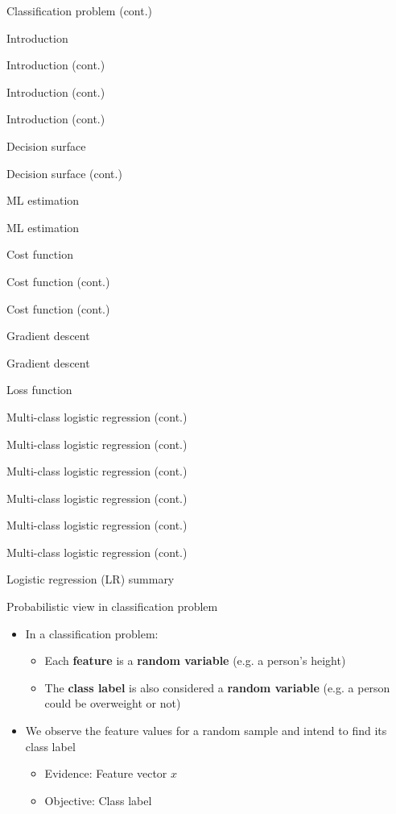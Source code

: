\documentclass[serif, aspectratio=169]{beamer}
\begin{document}
\begin{frame}{Classification problem (cont.)}
\begin{itemize}
\begin{frame}{Introduction}
\begin{itemize}
\begin{frame}{Introduction (cont.)}
\begin{frame}{Introduction (cont.)}
\begin{frame}{Introduction (cont.)}
\begin{frame}{Decision surface}
\begin{itemize}
\begin{frame}{Decision surface (cont.)}
\begin{frame}{ML estimation}
\begin{frame}{ML estimation}
\begin{itemize}
\begin{frame}{Cost function}
\begin{frame}{Cost function (cont.)}
\begin{itemize}
\begin{itemize}
\begin{frame}{Cost function (cont.)}
\begin{frame}{Gradient descent}
\begin{frame}{Gradient descent}
\begin{frame}{Loss function}
\begin{frame}{Multi-class logistic regression (cont.)}
\begin{frame}{Multi-class logistic regression (cont.)}
\begin{frame}{Multi-class logistic regression (cont.)}
\begin{frame}{Multi-class logistic regression (cont.)}
\begin{frame}{Multi-class logistic regression (cont.)}
\begin{frame}{Multi-class logistic regression (cont.)}
\begin{frame}{Logistic regression (LR) summary}
\begin{itemize}

\begin{frame}{Probabilistic view in classification problem}
    \begin{itemize}
        \item In a classification problem:
            \begin{itemize}
                \item Each \textbf{feature} is a \textbf{random variable} (e.g. a person's height)
                \item The \textbf{class label} is also considered a \textbf{random variable} (e.g. a person could be overweight or not)
            \end{itemize}
        \item We observe the feature values for a random sample and intend to find its class label
            \begin{itemize}
                \item Evidence: Feature vector $x$
                \item Objective: Class label
            \end{itemize}

\end{itemize}
\end{frame}
\end{itemize}
\end{frame}
\end{frame}
\end{frame}
\end{frame}
\end{frame}
\end{frame}
\end{frame}
\end{frame}
\end{frame}
\end{frame}
\end{frame}
\end{itemize}
\end{itemize}
\end{frame}
\end{frame}
\end{itemize}
\end{frame}
\end{frame}
\end{frame}
\end{itemize}
\end{frame}
\end{frame}
\end{frame}
\end{frame}
\end{itemize}
\end{frame}
\end{itemize}
\end{frame}
\end{document}
